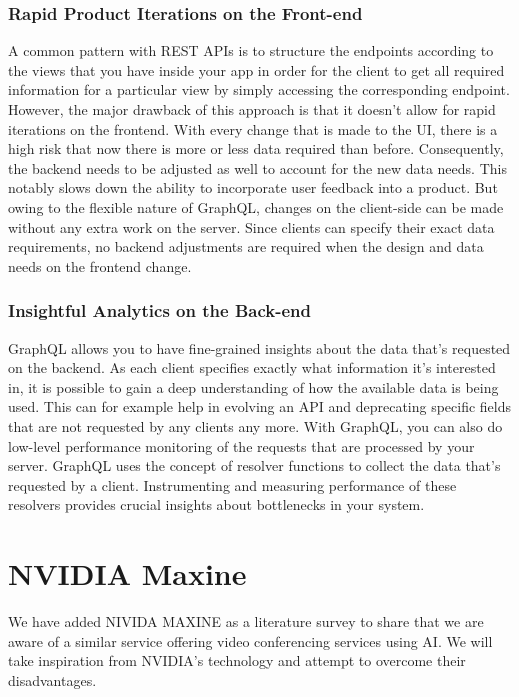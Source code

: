 \subsubsection{Rapid Product Iterations on the Front-end}

A common pattern with REST APIs is to structure the endpoints according to the views that you have inside your app 
in order for the client to get all required information for a particular view by simply accessing the corresponding 
endpoint. However, the major drawback of this approach is that it doesn’t allow for rapid iterations on the frontend. 
With every change that is made to the UI, there is a high risk that now there is more or less data required than before.
Consequently, the backend needs to be adjusted as well to account for the new data needs. This notably slows down the 
ability to incorporate user feedback into a product. But owing to the flexible nature of GraphQL, changes on the 
client-side can be made without any extra work on the server. Since clients can specify their exact data requirements, 
no backend adjustments are required when the design and data needs on the frontend change.

\subsubsection{Insightful Analytics on the Back-end}

GraphQL allows you to have fine-grained insights about the data that’s requested on the backend. As each client specifies 
exactly what information it’s interested in, it is possible to gain a deep understanding of how the available data is being 
used. This can for example help in evolving an API and deprecating specific fields that are not requested by any clients any more.
With GraphQL, you can also do low-level performance monitoring of the requests that are processed by your server. 
GraphQL uses the concept of resolver functions to collect the data that’s requested by a client. Instrumenting and measuring 
performance of these resolvers provides crucial insights about bottlenecks in your system.~\cite{GraphQLvsREST}

\section{NVIDIA Maxine}

We have added NIVIDA MAXINE as a literature survey to share that we are aware of 
a similar service offering video conferencing services using AI. We will take 
inspiration from NVIDIA's technology and attempt to overcome their disadvantages.

